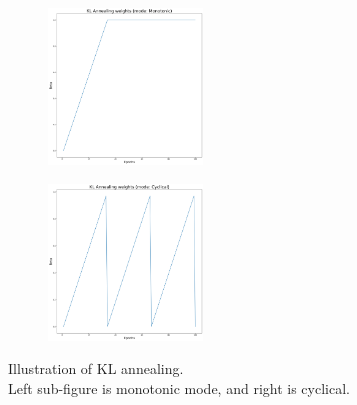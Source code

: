     \begin{figure}[H]
        \centering
        \begin{subfigure}
            \centering
            \includegraphics[width=0.45\textwidth]{img/mono.png}
            \label{kl-annealing-mono}
        \end{subfigure}
        \hfill
        \begin{subfigure}
            \centering
            \includegraphics[width=0.45\textwidth]{img/cyc.png}
            \label{kl-annealing-cyc}
        \end{subfigure}
        \hfill
        \caption{Illustration of KL annealing.\\Left sub-figure is monotonic mode, and right is cyclical.}
   \end{figure}

